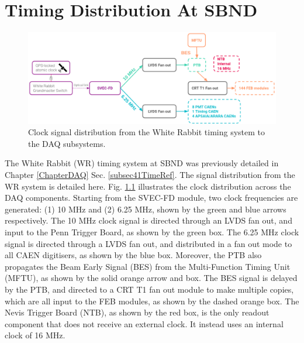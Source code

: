
\chapter{Timing Distribution At SBND} 
\label{appendix_timing_dist}
\ifpdf
    \graphicspath{{Appendix3/Figs/Raster/}{Appendix3/Figs/PDF/}{Appendix3/Figs/}}
\else
    \graphicspath{{Appendix3/Figs/Vector/}{Appendix3/Figs/}}
\fi


\begin{figure}[b!] 
\centering    
\includegraphics[width=1.0\textwidth]{clock_dist}
\caption[PPS Signal Distribution]{
Clock signal distribution from the White Rabbit timing system to the DAQ subsystems. 
}
\label{fig:clock_dist}
\end{figure}

The White Rabbit (WR) timing system at SBND was previously detailed in Chapter \ref{ChapterDAQ} Sec. \ref{subsec41TimeRef}.                                            
The signal distribution from the WR system is detailed here.                                                                                                           
Fig. \ref{fig:clock_dist} illustrates the clock distribution across the DAQ components.                                                                                
Starting from the SVEC-FD module, two clock frequencies are generated: (1) 10 MHz and (2) 6.25 MHz, shown by the green and blue arrows respectively.
The 10 MHz clock signal is directed through an LVDS fan out, and input to the Penn Trigger Board, as shown by the green box.
The 6.25 MHz clock signal is directed through a LVDS fan out, and distributed in a fan out mode to all CAEN digitisers, as shown by the blue box.                      
Moreover, the PTB also propagates the Beam Early Signal (BES) from the Multi-Function Timing Unit (MFTU), as shown by the solid orange arrow and box.                  
The BES signal is delayed by the PTB, and directed to a CRT T1 fan out module to make multiple copies, which are all input to the FEB modules, as shown by the dashed orange box.                                                                                                                                                             
The Nevis Trigger Board (NTB), as shown by the red box, is the only readout component that does not receive an external clock.                                         
It instead uses an internal clock of 16 MHz.                                                                                                                           

